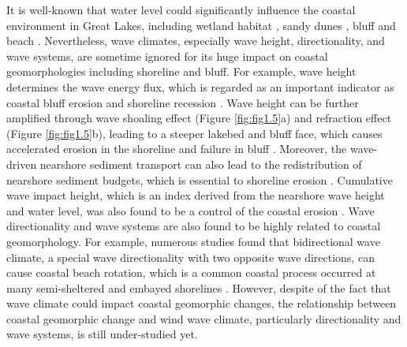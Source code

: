 It is well-known that water level could significantly influence the coastal
environment in Great Lakes, including wetland habitat
\citep{hohman_influence_2021,anderson_influence_2023}, sandy dunes
\citep{arbogast_maximum-limiting_1999,kilibarda_70year_2015}, bluff
\citep{volpano_three-dimensional_2020} and beach \citep{scholle_responses_2022}.
Nevertheless, wave climates, especially wave height, directionality, and wave
systems, are sometime ignored for its huge impact on coastal geomorphologies
including shoreline and bluff. For example, wave height determines the wave
energy flux, which is regarded as an important indicator as coastal bluff
erosion and shoreline recession
\citep{benumof_relationship_2000,galal_influence_2011}. Wave height can be
further amplified through wave shoaling effect (Figure \ref{fig:fig1.5}a) and
refraction effect (Figure \ref{fig:fig1.5}b), leading to a steeper lakebed and
bluff face, which causes accelerated erosion in the shoreline and failure in
bluff \citep{booth_wave_1994}. Moreover, the wave-driven nearshore sediment
transport can also lead to the redistribution of nearshore sediment budgets,
which is essential to shoreline erosion
\citep{amin_statistical_1997,usace_cem_2002,adams_effects_2011,dalrymple_sediment_2001}.
Cumulative wave impact height, which is an index derived from the nearshore wave
height and water level, was also found to be a control of the coastal erosion
\citep{ruggiero_wave_2001,swenson_bluff_2006}. Wave directionality and wave
systems are also found to be highly related to coastal geomorphology. For
example, numerous studies found that bidirectional wave climate, a special wave
directionality with two opposite wave directions, can cause coastal beach
rotation, which is a common coastal process occurred at many semi-sheltered and
embayed shorelines
\citep{klein_short-term_2002,wiggins_coastal_2019,wiggins_regionally-coherent_2019,loureiro_24_2020}.
However, despite of the fact that wave climate could impact coastal geomorphic
changes, the relationship between coastal geomorphic change and wind wave
climate, particularly directionality and wave systems, is still under-studied
yet. 


